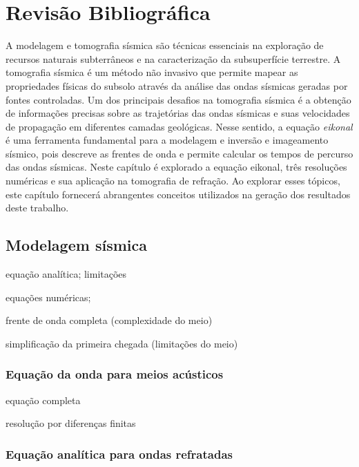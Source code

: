 \chapter{Revisão Bibliográfica}
\label{ch:revisaobibliografica}

A modelagem e tomografia sísmica são técnicas essenciais na exploração de recursos naturais subterrâneos e na caracterização da subsuperfície terrestre. A tomografia sísmica é um método não invasivo que permite mapear as propriedades físicas do subsolo através da análise das ondas sísmicas geradas por fontes controladas. Um dos principais desafios na tomografia sísmica é a obtenção de informações precisas sobre as trajetórias das ondas sísmicas e suas velocidades de propagação em diferentes camadas geológicas. Nesse sentido, a equação \textit{eikonal}  é uma ferramenta fundamental para a modelagem e inversão e imageamento sísmico, pois descreve as frentes de onda e permite calcular os tempos de percurso das ondas sísmicas. Neste capítulo é explorado a equação eikonal, três resoluções numéricas e sua aplicação na tomografia de refração. Ao explorar esses tópicos, este capítulo fornecerá abrangentes conceitos utilizados na geração dos resultados deste trabalho.

\section{Modelagem sísmica}

equação analítica; limitações

equações numéricas;
	
frente de onda completa (complexidade do meio)
	
simplificação da primeira chegada (limitações do meio)

\subsection*{Equação da onda para meios acústicos}

equação completa

resolução por diferenças finitas

\subsection*{Equação analítica para ondas refratadas}

